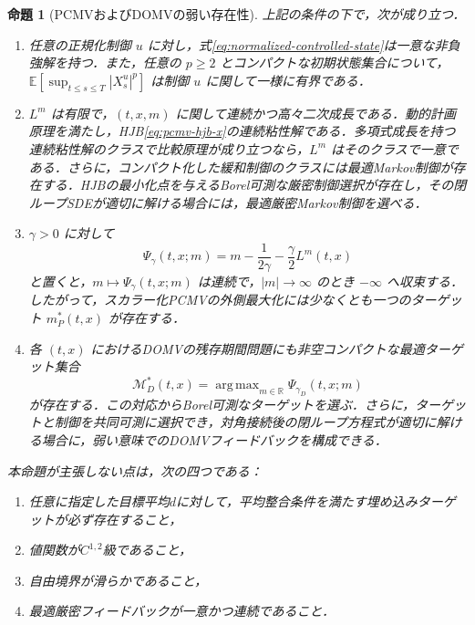 \documentclass[10pt,a4paper]{article}
\theoremstyle{plain}
\newtheorem{proposition}{命題}
\theoremstyle{definition}
\newcommand{\E}{\mathbb{E}}
\DeclareMathOperator*{\argmax}{arg\,max}
\begin{document}
\begin{proposition}[PCMVおよびDOMVの弱い存在性]
\label{prop:weak-existence-pcmv-domv}
上記の条件の下で，次が成り立つ．
\begin{enumerate}[label=(\roman*),leftmargin=2.2em]
 \item 任意の正規化制御 $u$ に対し，式\eqref{eq:normalized-controlled-state}は一意な非負強解を持つ．また，任意の $p\geq2$ とコンパクトな初期状態集合について，$\E[\sup_{t\leq s\leq T}|X_s^u|^p]$ は制御 $u$ に関して一様に有界である．
 \item $L^m$ は有限で，$(t,x,m)$ に関して連続かつ高々二次成長である．動的計画原理を満たし，HJB\eqref{eq:pcmv-hjb-x}の連続粘性解である．多項式成長を持つ連続粘性解のクラスで比較原理が成り立つなら，$L^m$ はそのクラスで一意である．さらに，コンパクト化した緩和制御のクラスには最適Markov制御が存在する．HJBの最小化点を与えるBorel可測な厳密制御選択が存在し，その閉ループSDEが適切に解ける場合には，最適厳密Markov制御を選べる．
 \item $\gamma>0$ に対して
 \begin{equation}
  \Psi_\gamma(t,x;m)
  =m-\frac{1}{2\gamma}-\frac{\gamma}{2}L^m(t,x)
  \label{eq:app-scalarized-envelope}
 \end{equation}
 と置くと，$m\mapsto\Psi_\gamma(t,x;m)$ は連続で，$|m|\to\infty$ のとき $-\infty$ へ収束する．したがって，スカラー化PCMVの外側最大化には少なくとも一つのターゲット $m_P^*(t,x)$ が存在する．
 \item 各 $(t,x)$ におけるDOMVの残存期間問題にも非空コンパクトな最適ターゲット集合
 \[
   \mathcal M_D^*(t,x)=\argmax_{m\in\mathbb R}\Psi_{\gamma_D}(t,x;m)
 \]
 が存在する．この対応からBorel可測なターゲットを選ぶ．さらに，ターゲットと制御を共同可測に選択でき，対角接続後の閉ループ方程式が適切に解ける場合に，弱い意味でのDOMVフィードバックを構成できる．
\end{enumerate}
本命題が主張しない点は，次の四つである：
\begin{enumerate}[label=(\alph*),leftmargin=2.2em,noitemsep,topsep=2pt]
 \item 任意に指定した目標平均$d$に対して，平均整合条件を満たす埋め込みターゲットが必ず存在すること，
 \item 値関数が$C^{1,2}$級であること，
 \item 自由境界が滑らかであること，
 \item 最適厳密フィードバックが一意かつ連続であること．
\end{enumerate}
\end{proposition}
\end{document}

